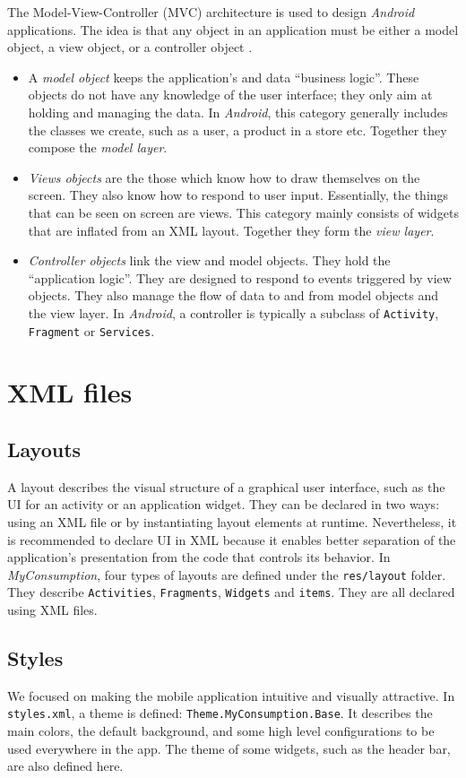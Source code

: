 \documentclass[a4paper, oneside, 11pt]{book}
\begin{document}
The Model-View-Controller (MVC) architecture is used to design \textit{Android} applications. The idea is that any object in an application must be either a model object, a view object, or a controller object \cite{bignerch:book}.
\begin{itemize}
	\item A \emph{model object} keeps the application’s and data “business logic”. These objects do not have any knowledge of the user interface; they only aim at holding and managing the data. In \textit{Android}, this category generally includes the classes we create, such as a user, a product in a store etc. Together they compose the \emph{model layer}.
	\item \emph{Views objects} are the those which know how to draw themselves on the screen. They also know how to respond to user input. Essentially, the things that can be seen on screen are views. This category mainly consists of widgets that are inflated from an XML layout. Together they form the \emph{view layer}.
	\item \emph{Controller objects} link the view and model objects. They hold the “application logic”. They are designed to respond to events triggered by view objects. They also manage the flow of data to and from model objects and the view layer. In \textit{Android}, a controller is typically a subclass of \texttt{Activity}, \texttt{Fragment} or \texttt{Services}.
\end{itemize}

\section{XML files}
\subsection{Layouts}
A layout describes the visual structure of a graphical user interface, such as the UI for an activity or an application widget. They can be declared in two ways: using an XML file or by instantiating layout elements at runtime. Nevertheless, it is recommended to declare UI in XML because it enables better separation of the application’s presentation from the code that controls its behavior. 
In \textit{MyConsumption}, four types of layouts are defined under the \texttt{res/layout} folder. They describe \texttt{Activities}, \texttt{Fragments}, \texttt{Widgets} and \texttt{items}. They are all declared using XML files.

\subsection{Styles}
We focused on making the mobile application intuitive and visually attractive. In \texttt{styles.xml}, a theme is defined: \texttt{Theme.MyConsumption.Base}. It describes the main colors, the default background, and some high level configurations to be used everywhere in the app. The theme of some widgets, such as the header bar, are also defined here.
\end{document}
